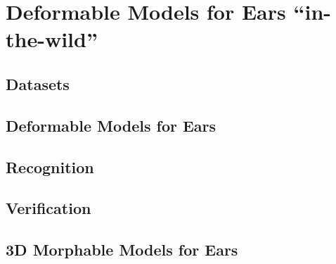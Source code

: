 \chapter{Deformable Models for Ears ``in-the-wild''}

\section{Datasets}

\section{Deformable Models for Ears}

\section{Recognition}

\section{Verification}

\section{3D Morphable Models for Ears}